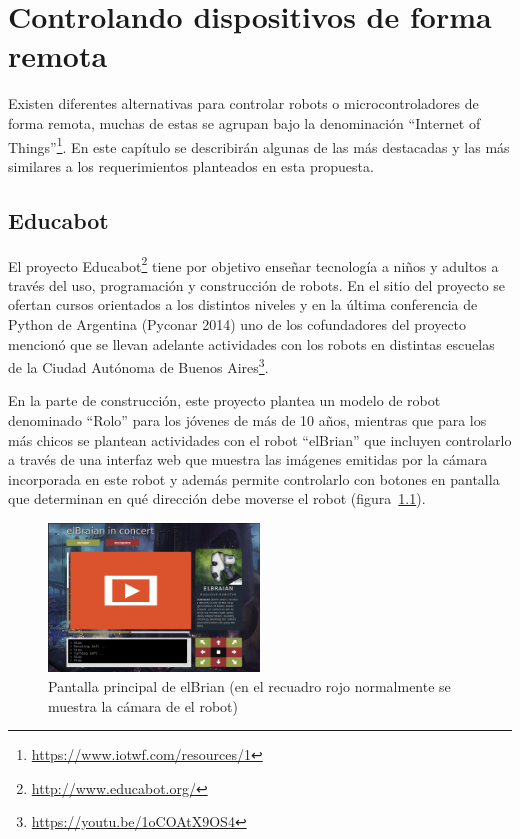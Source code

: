 \chapter{Controlando dispositivos de forma remota}\label{cha:arte}

Existen diferentes alternativas para controlar robots o microcontroladores
de forma remota, muchas de estas se agrupan bajo la denominación
``Internet of Things''\footnote{\url{https://www.iotwf.com/resources/1}}.
En este capítulo se describirán algunas de las
más destacadas y las más similares a los requerimientos planteados en esta
propuesta.


\section{Educabot}
El proyecto Educabot\footnote{\url{http://www.educabot.org/}} tiene por
objetivo enseñar tecnología a niños y adultos a través
del uso, programación y construcción de robots. En el sitio del proyecto
se ofertan cursos orientados a los distintos niveles y 
en la última conferencia de Python de Argentina (Pyconar 2014) uno de
los cofundadores del proyecto mencionó que se llevan adelante actividades
con los robots
en distintas escuelas de la Ciudad Autónoma de Buenos
Aires\footnote{\url{https://youtu.be/1oCOAtX9OS4}}.


En la parte de construcción, este proyecto plantea un modelo de robot
denominado
``Rolo'' para los jóvenes de más de 10 años, mientras que para los más chicos
se plantean actividades con el robot ``elBrian'' que incluyen
controlarlo a través de una interfaz web que muestra las imágenes emitidas
por la cámara incorporada en este robot y además permite controlarlo con
botones en pantalla que determinan en qué dirección debe moverse el robot
(figura~\ref{fig:elbrian}).

\begin{figure}
    \centering
    \includegraphics[width=0.5\textwidth]{figures/elbrian-1}
    \caption{Pantalla principal de elBrian (en el recuadro rojo normalmente
        se muestra la cámara de el robot)}
    \label{fig:elbrian}
\end{figure}

